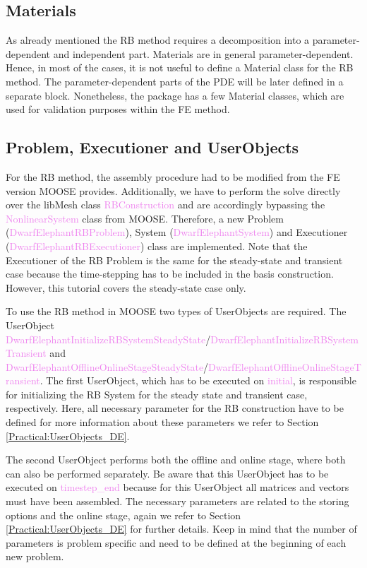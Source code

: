 \documentclass[11pt, a4paper, DIV=14]{scrartcl}
\begin{document}
\subsection{Materials}
As already mentioned the RB method requires a decomposition into a parameter-dependent and independent part. Materials are in general parameter-dependent. Hence, in most of the cases, it is not useful to define a Material class for the RB method. The parameter-dependent parts of the PDE will be later defined in a separate block. Nonetheless, the package has a few Material classes, which are used for validation purposes within the FE method.

\subsection{Problem, Executioner and UserObjects}
For the RB method, the assembly procedure had to be modified from the FE version MOOSE provides. Additionally, we have to perform the solve directly over the libMesh class \textcolor{violet}{RBConstruction} and are accordingly bypassing the \textcolor{violet}{NonlinearSystem} class from MOOSE. Therefore, a new Problem (\textcolor{violet}{DwarfElephantRBProblem}), System (\textcolor{violet}{DwarfElephantSystem}) and Executioner (\textcolor{violet}{DwarfElephantRB\-Executioner}) class are implemented. Note that the Executioner of the RB Problem is the same for the steady-state and transient case because the time-stepping has to be included in the basis construction. However, this tutorial covers the steady-state case only.

To use the RB method in MOOSE two types of UserObjects are required.
The UserObject \textcolor{violet}{DwarfElephant\-Initialize\-RB\-System\-Steady\-State}/\textcolor{violet}{DwarfElephant\-Initialize\-RB\-System\-Transient} and \textcolor{violet}{Dwarf\-Elephant\-Offline\-Online\-Stage\-Steady\-State}/\textcolor{violet}{Dwarf\-Elephant\-Offline\-Online\-Stage\-Transient}. The first UserObject, which has to be executed on \textcolor{violet}{initial}, is responsible for initializing the RB System for the steady state and transient case, respectively. Here, all necessary parameter for the RB construction have to be defined for more information about these parameters we refer to Section \ref{Practical:UserObjects_DE}. 

The second UserObject performs both the offline and online stage, where both can also be performed separately. Be aware that this UserObject has to be executed on \textcolor{violet}{timestep\_end} because for this UserObject all matrices and vectors must have been assembled. The necessary parameters are related to the storing options and the online stage, again we refer to Section \ref{Practical:UserObjects_DE} for further details.
Keep in mind that the number of parameters is problem specific and need to be defined at the beginning of each new problem.
\end{document}
